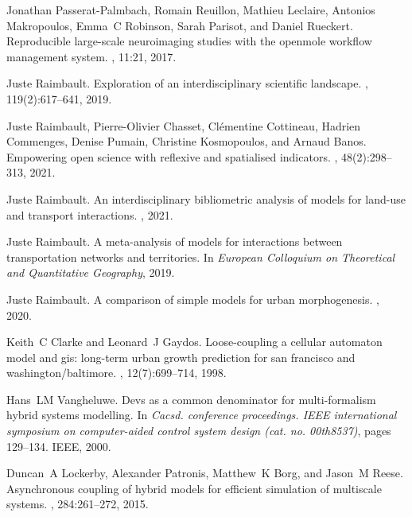\begin{thebibliography}{10}
Jonathan Passerat-Palmbach, Romain Reuillon, Mathieu Leclaire, Antonios
  Makropoulos, Emma~C Robinson, Sarah Parisot, and Daniel Rueckert.
\newblock Reproducible large-scale neuroimaging studies with the openmole
  workflow management system.
, 11:21, 2017.

Juste Raimbault.
\newblock Exploration of an interdisciplinary scientific landscape.
, 119(2):617--641, 2019.

Juste Raimbault, Pierre-Olivier Chasset, Cl{\'e}mentine Cottineau, Hadrien
  Commenges, Denise Pumain, Christine Kosmopoulos, and Arnaud Banos.
\newblock Empowering open science with reflexive and spatialised indicators.
,
  48(2):298--313, 2021.

Juste Raimbault.
\newblock An interdisciplinary bibliometric analysis of models for land-use and
  transport interactions.
, 2021.

Juste Raimbault.
\newblock A meta-analysis of models for interactions between transportation
  networks and territories.
\newblock In {\em European Colloquium on Theoretical and Quantitative
  Geography}, 2019.

Juste Raimbault.
\newblock A comparison of simple models for urban morphogenesis.
, 2020.

Keith~C Clarke and Leonard~J Gaydos.
\newblock Loose-coupling a cellular automaton model and gis: long-term urban
  growth prediction for san francisco and washington/baltimore.
,
  12(7):699--714, 1998.

Hans~LM Vangheluwe.
\newblock Devs as a common denominator for multi-formalism hybrid systems
  modelling.
\newblock In {\em Cacsd. conference proceedings. IEEE international symposium
  on computer-aided control system design (cat. no. 00th8537)}, pages 129--134.
  IEEE, 2000.

Duncan~A Lockerby, Alexander Patronis, Matthew~K Borg, and Jason~M Reese.
\newblock Asynchronous coupling of hybrid models for efficient simulation of
  multiscale systems.
, 284:261--272, 2015.


\end{thebibliography}
